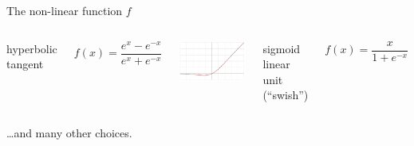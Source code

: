 \documentclass[aspectratio=169]{beamer}
\begin{document}
\begin{frame}{The non-linear function $f$}
\begin{columns}
hyperbolic tangent

\vspace{-\baselineskip}
\[ f(x) = \frac{e^x - e^{-x}}{e^x + e^{-x}} \]

\includegraphics[width=\linewidth]{Activation_swish.pdf}

sigmoid linear unit (``swish'')

\[ f(x) = \frac{x}{1 + e^{-x}} \]
\end{columns}

\large

\vspace{0.5 cm}
\ldots and many other choices.
\end{frame}
\end{document}
